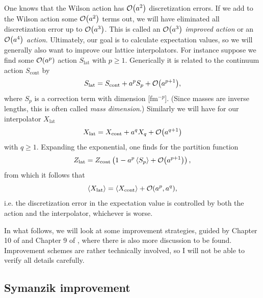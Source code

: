 One knows that the Wilson action has
$\order{a^2}$ discretization errors. If we add to the Wilson action some
$\order{a^2}$ terms out, we will have eliminated all discretization error
up to $\order{a^3}$. This is called an $\order{a^3}$ {\it improved action}
or an $\order{a^4}$ {\it action}. Ultimately, our goal is to calculate
expectation values, so we will generally also want to improve our 
lattice interpolators. For instance suppose we find some $\order{a^p}$
action $S_\text{lat}$ with $p\geq1$. Generically it is related to the 
continuum action $S_{\text{cont}}$ by
\begin{equation}
  S_\text{lat}=S_\text{cont}+a^pS_p+\order{a^{p+1}},
\end{equation}
where $S_p$ is a correction term with dimension [fm$^{-p}$]. (Since masses are
inverse lengths, this is often called {\it mass dimension}.) 
 Similarly we will
have for our interpolator $X_\text{lat}$ 
\begin{equation}
   X_\text{lat} = X_\text{cont}+a^qX_q +\order{a^{q+1}}
\end{equation}
with $q\geq1$. Expanding the exponential, one finds for the partition function
\begin{equation}
  Z_\text{lat}=Z_\text{cont}\left(1-a^p\ev{S_p}+\order{a^{p+1}}\right),
\end{equation}
from which it follows that
\begin{equation}
\ev{X_\text{lat}}=\ev{X_\text{cont}}+\order{a^p,a^q},
\end{equation}
i.e. the discretization error in the expectation value is controlled by both
the action and the interpolator, whichever is worse.

In what follows, we will look at some improvement strategies, guided by 
Chapter 10 of \cite{degrand_lattice_2006} and Chapter 9 of
\cite{gattringer_quantum_2010}, where there is also more discussion to 
be found. Improvement schemes are rather technically
involved, so I will not be able to verify all details carefully.

\subsection{Symanzik improvement}

